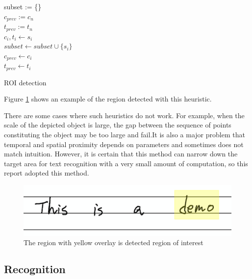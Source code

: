 \begin{algorithm}
\DontPrintSemicolon
    subset := \{\} \\
    $c_{prev} := c_n$ \\
    $t_{prev} := t_n$ \\
    {
        $c_i, t_i \leftarrow s_i$\\
        {
            $subset \leftarrow subset \cup \{s_i\}$ \\

        } 
        $c_{prev} \leftarrow c_i$ \\
        $t_{prev} \leftarrow t_i$
    }
\caption{ROI detection}
\label{alg:roi}
\end{algorithm}

Figure \ref{fig:region_of_interest} shows an example of the region detected with
this heuristic.

There are some cases where such heuristics do not work. For example, when the scale of
the depicted object is large, the gap between the sequence of points
constituting the object may be too large and fail.It is also a major problem that
temporal and spatial proximity depends on parameters and sometimes does not match intuition.
However, it is certain that this method can narrow down the target area for text recognition
with a very small amount of computation, so this report adopted this method.

\begin{figure}
    \centering
    \includegraphics[width=\linewidth]{images/region_of_interest.png}
    \caption{The region with yellow overlay is detected region of interest}
    \label{fig:region_of_interest}
\end{figure}

\subsection{Recognition}

